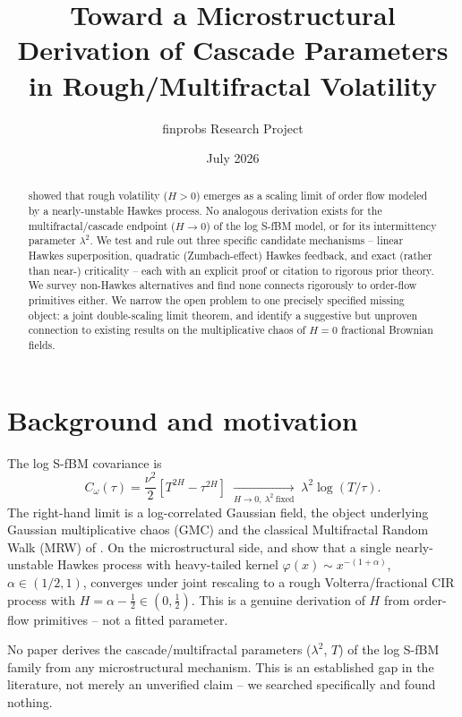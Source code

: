 \documentclass[11pt]{article}
\title{Toward a Microstructural Derivation of Cascade Parameters\\ in Rough/Multifractal Volatility}
\author{finprobs Research Project}
\date{July 2026}
\begin{document}
\maketitle

\begin{abstract}
\citet{eleuch2018microstructural} showed that rough volatility ($H>0$) emerges as a scaling limit of order flow modeled by a nearly-unstable Hawkes process. No analogous derivation exists for the multifractal/cascade endpoint ($H\to0$) of the log S-fBM model, or for its intermittency parameter $\lambda^2$. We test and rule out three specific candidate mechanisms -- linear Hawkes superposition, quadratic (Zumbach-effect) Hawkes feedback, and exact (rather than near-) criticality -- each with an explicit proof or citation to rigorous prior theory. We survey non-Hawkes alternatives and find none connects rigorously to order-flow primitives either. We narrow the open problem to one precisely specified missing object: a joint double-scaling limit theorem, and identify a suggestive but unproven connection to existing results on the multiplicative chaos of $H=0$ fractional Brownian fields.
\end{abstract}

\section{Background and motivation}

The log S-fBM covariance \citep{wu2022rough} is
\begin{equation}
C_\omega(\tau) = \frac{\nu^2}{2}\left[T^{2H}-\tau^{2H}\right] \;\xrightarrow[H\to0,\ \lambda^2\ \text{fixed}]{}\; \lambda^2\log(T/\tau). \label{eq:cov-limit}
\end{equation}
The right-hand limit is a log-correlated Gaussian field, the object underlying Gaussian multiplicative chaos (GMC) \citep{kahane1985chaos,rhodes2014gaussian} and the classical Multifractal Random Walk (MRW) of \citet{bacry2003multifractal}. On the microstructural side, \citet{jaisson2016rough} and \citet{eleuch2018microstructural} show that a single nearly-unstable Hawkes process with heavy-tailed kernel $\varphi(x)\sim x^{-(1+\alpha)}$, $\alpha\in(1/2,1)$, converges under joint rescaling to a rough Volterra/fractional CIR process with $H=\alpha-\tfrac12\in(0,\tfrac12)$. This is a genuine derivation of $H$ from order-flow primitives -- not a fitted parameter.

\begin{finding}
No paper derives the cascade/multifractal parameters ($\lambda^2$, $T$) of the log S-fBM family from any microstructural mechanism. This is an established gap in the literature, not merely an unverified claim -- we searched specifically and found nothing.
\end{finding}
\end{document}
